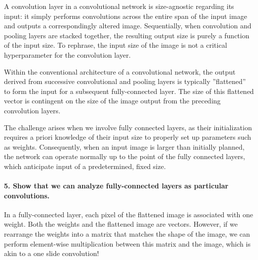 \documentclass{article}
\theoremstyle{plain}%
\theoremstyle{definition}
\theoremstyle{remark}
\begin{document}


A convolution layer in a convolutional network is size-agnostic regarding its input: it simply performs convolutions across the entire span of the input image and outputs a correspondingly altered image. Sequentially, when convolution and pooling layers are stacked together, the resulting output size is purely a function of the input size. To rephrase, the input size of the image is not a critical hyperparameter for the convolution layer.

Within the conventional architecture of a convolutional network, the output derived from successive convolutional and pooling layers is typically ''flattened'' to form the input for a subsequent fully-connected layer. The size of this flattened vector is contingent on the size of the image output from the preceding convolution layers.

The challenge arises when we involve fully connected layers, as their initialization requires a priori knowledge of their input size to properly set up parameters such as weights. Consequently, when an input image is larger than initially planned, the network can operate normally up to the point of the fully connected layers, which anticipate input of a predetermined, fixed size.

\paragraph{5. Show that we can analyze fully-connected layers as particular convolutions.}
In a fully-connected layer, each pixel of the flattened image is associated with one weight. Both the weights and the flattened image are vectors. However, if we rearrange the weights into a matrix that matches the shape of the image, we can perform element-wise multiplication between this matrix and the image, which is akin to a one slide convolution!
\end{document}
